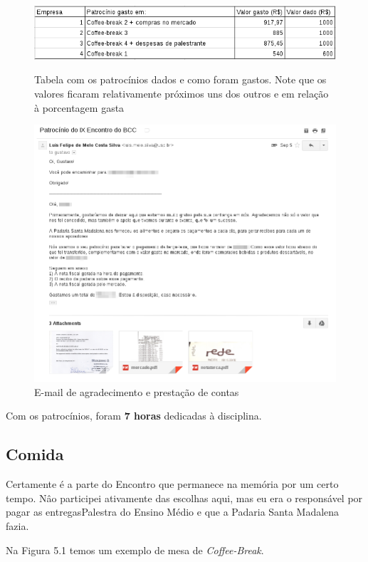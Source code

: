 \documentclass[12pt,letterpaper]{article}
\begin{document}
	\begin{figure}
		\begin{center}
			\includegraphics[scale=0.43]{tabela.png} 
			\caption{Tabela com os patrocínios dados e como foram gastos. Note que os valores ficaram relativamente próximos uns dos outros e em relação à porcentagem gasta} 
			\includegraphics[scale=0.43]{conta.png} 
			\caption{E-mail de agradecimento e prestação de contas}
		\end{center}
	\end{figure}
	
	Com os patrocínios, foram \textbf{7 horas} dedicadas à disciplina.
	
	\subsection{Comida}
	
	Certamente é a parte do Encontro que permanece na memória por um certo tempo. Nâo participei ativamente das escolhas aqui, mas eu era o responsável por pagar as entregasPalestra do Ensino Médio e  que a Padaria Santa Madalena fazia.
	
	Na Figura 5.1 temos um exemplo de mesa de \textit{Coffee-Break}.
	
\end{document}
